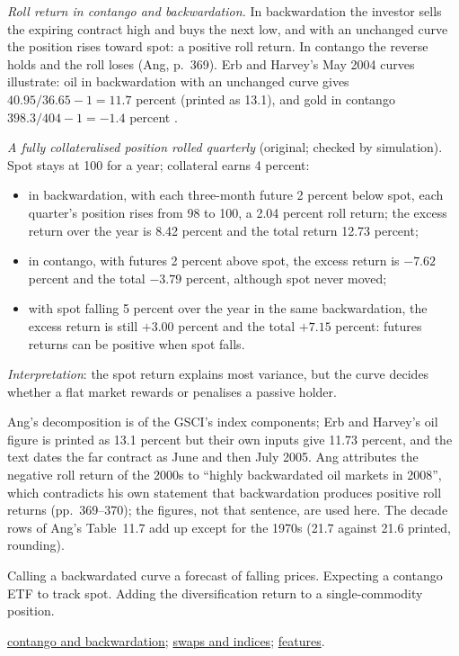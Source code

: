 \begin{qfmethod}
\emph{Roll return in contango and backwardation.} In backwardation the investor sells the expiring contract high and buys the next low, and with an unchanged curve the position rises toward spot: a positive roll return. In contango the reverse holds and the roll loses (Ang, p.~369). Erb and Harvey's May 2004 curves illustrate: oil in backwardation with an unchanged curve gives $40.95/36.65-1=11.7$ percent (printed as 13.1), and gold in contango $398.3/404-1=-1.4$ percent \citep[p.~13]{wide-erb-harvey-commodity}.

 \emph{A fully collateralised position rolled quarterly} (original; checked by simulation). Spot stays at 100 for a year; collateral earns 4 percent:
\begin{itemize}
\item in backwardation, with each three-month future 2 percent below spot, each quarter's position rises from 98 to 100, a 2.04 percent roll return; the excess return over the year is 8.42 percent and the total return 12.73 percent;
\item in contango, with futures 2 percent above spot, the excess return is $-7.62$ percent and the total $-3.79$ percent, although spot never moved;
\item with spot falling 5 percent over the year in the same backwardation, the excess return is still $+3.00$ percent and the total $+7.15$ percent: futures returns can be positive when spot falls.
\end{itemize}
\emph{Interpretation}: the spot return explains most variance, but the curve decides whether a flat market rewards or penalises a passive holder.

 Ang's decomposition is of the GSCI's index components; Erb and Harvey's oil figure is printed as 13.1 percent but their own inputs give 11.73 percent, and the text dates the far contract as June and then July 2005. Ang attributes the negative roll return of the 2000s to ``highly backwardated oil markets in 2008'', which contradicts his own statement that backwardation produces positive roll returns (pp.~369--370); the figures, not that sentence, are used here. The decade rows of Ang's Table~11.7 add up except for the 1970s (21.7 against 21.6 printed, rounding).

 Calling a backwardated curve a forecast of falling prices. Expecting a contango ETF to track spot. Adding the diversification return to a single-commodity position.

 \hyperref[def:contango-backwardation-stocks]{contango and backwardation}; \hyperref[meth:commodity-swaps-index-construction]{swaps and indices}; \hyperref[def:commodity-features]{features}.

\end{qfmethod}
